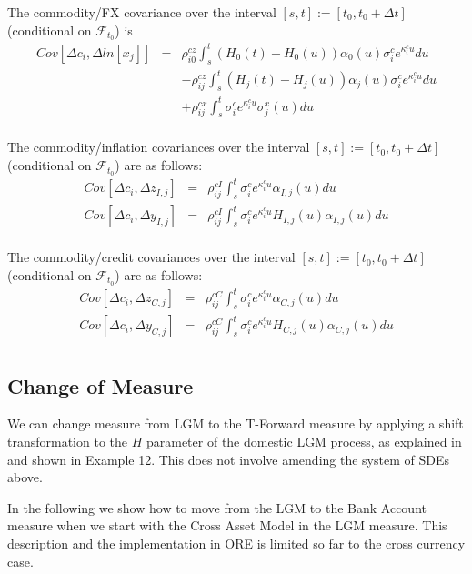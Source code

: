 The commodity/FX covariance over the interval $[s,t] := [t_0, t_0+\Delta t]$ (conditional on $\mathcal{F}_{t_0}$) is
\begin{eqnarray*}
	Cov \left[\Delta c_i, \Delta ln[x_j] \right] &=& \rho_{i0}^{cz} \int_s^t (H_0 (t) - H_0 (u)) \alpha_0 (u) \sigma_i^c e^{\kappa^c_i u}  du\\
	&&- \rho_{ij}^{cz} \int_s^t (H_j (t) - H_j (u)) \alpha_j (u) \sigma_i^c e^{\kappa^c_i u}  du\\
	&&+ \rho_{ij}^{cx} \int_s^t \sigma_i^c e^{\kappa^c_i u} \sigma^x_j(u) du\\
\end{eqnarray*}

The commodity/inflation covariances over the interval $[s,t] := [t_0, t_0+\Delta t]$ (conditional on $\mathcal{F}_{t_0}$) are as follows:
\begin{eqnarray*}
	Cov \left[\Delta c_i, \Delta z_{I,j} \right] &=& \rho_{ij}^{cI} \int_s^t \sigma_i^c e^{\kappa^c_i u } \alpha_{I,j} (u) du\\	
	Cov \left[\Delta c_i, \Delta y_{I,j} \right] &=&\rho_{ij}^{cI} \int_s^t \sigma_i^c e^{\kappa^c_i u } H_{I,j} (u) \alpha_{I,j} (u) du\\
\end{eqnarray*}

The commodity/credit covariances over the interval $[s,t] := [t_0, t_0+\Delta t]$ (conditional on $\mathcal{F}_{t_0}$) are as follows:
\begin{eqnarray*}
	Cov \left[\Delta c_i, \Delta z_{C,j} \right] &=& \rho_{ij}^{cC} \int_s^t \sigma_i^c e^{\kappa^c_i u } \alpha_{C,j} (u) du\\
	Cov \left[\Delta c_i, \Delta y_{C,j} \right] &=&\rho_{ij}^{cC} \int_s^t \sigma_i^c e^{\kappa^c_i u } H_{C,j} (u) \alpha_{C,j} (u) du\\
\end{eqnarray*}

\subsection{Change of Measure}

We can change measure from LGM to the T-Forward measure by applying a shift transformation to the $H$ parameter of the domestic LGM process, as explained in \cite{Lichters} and shown in Example 12. This does not involve amending the system of SDEs above.

\medskip
\noindent
In the following we show how to move from the LGM to the Bank Account measure when we start with the Cross Asset Model in the LGM measure. This description and the implementation in ORE is limited so far to the cross currency case.

